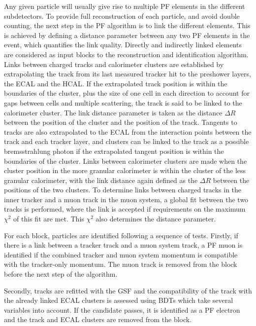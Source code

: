 Any given particle will usually give rise to multiple \ac{PF}
elements in the different subdetectors. To provide full reconstruction
of each particle, and avoid double counting, the next step in the
\ac{PF} algorithm is to link the different elements. This is
achieved by defining a distance parameter between any two \ac{PF} elements
in the event, which quantifies the link quality. Directly and indirectly
linked elements are considered as input blocks to the reconstruction and
identification algorithm. Links between charged tracks and calorimeter
clusters are established by extrapolating the track from its last measured
tracker hit to the preshower layers, the \ac{ECAL} and the \ac{HCAL}. %
If the extrapolated track position is within the boundaries of the cluster, plus the size
of one cell in each direction to account for gaps between cells and multiple scattering, the
track is said to be linked to the calorimeter cluster. The link distance parameter 
is taken as the distance $\Delta R$ 
between the position of the cluster and the position of the track. Tangents to tracks are also extrapolated
to the ECAL from the interaction points between the track and each tracker layer, and clusters can be 
linked to the track as a possible bremsstrahlung photon if the extrapolated tangent
position is within the boundaries of the cluster.
Links between calorimeter clusters are made when the cluster position in the
more granular calorimeter is within the cluster of the less granular calorimeter,
with the link distance again defined as the $\Delta R$ between the positions of the two clusters.
To determine links between charged tracks in the inner tracker and a muon track
in the muon system, a global fit between the two tracks is performed, where the link
is accepted if requirements on the maximum $\chi^2$ of this fit are met. This
$\chi^2$ also determines the distance parameter.

For each block, particles are identified following a sequence
of tests. Firstly, if there is a link between a tracker track and a muon system track,
a \ac{PF} muon is identified if the combined tracker and muon system
momentum is compatible with the tracker-only momentum. %
The muon track is removed from the block before the next step of the algorithm.

Secondly, tracks are refitted with the \ac{GSF} and the compatibility
of the track with the already linked \ac{ECAL} clusters is assessed using
\acp{BDT} which take several variables into account. If the candidate
passes, it is identified as a \ac{PF} electron and the track and
\ac{ECAL} clusters are removed from the block.

